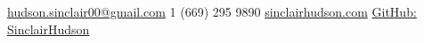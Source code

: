 \documentclass[10pt,a4paper]{article} %
\begin{document}
 



\noindent\href{mailto:hudson.sinclair00@gmail.com}{hudson.sinclair00@gmail.com}\bull %
\textsmaller{+}1 (669) 295 9890 \bull %
\href{http://www.sinclairhudson.com}{sinclairhudson.com} \bull
\href{https://github.com/SinclairHudson}{GitHub: SinclairHudson}

\spacedhrule{0.4em}{-0.4em} %



\spacedhrule{0.4em}{-0.4em} %



\spacedhrule{0.6em}{-0.4em} %



\spacedhrule{1.4em}{-0.4em} %


\end{document}
